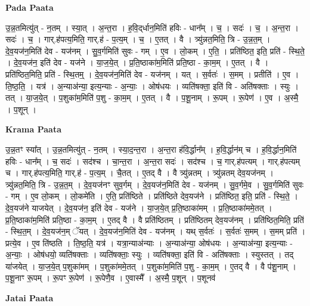 \documentclass[17pt]{extarticle}
\begin{document}
\textbf{Pada Paata} \newline

उ॒न्न॒तमित्यु॑त् - न॒तम् । स्या॒त् । अ॒न्त॒रा । ह॒वि॒द्‌र्धान॒मिति॑ हविः - धान᳚म् । च॒ । सदः॑ । च॒ । अ॒न्त॒रा । सदः॑ । च॒ । गार्.ह॑पत्य॒मिति॒ गार्.ह॑ - प॒त्य॒म् । च॒ । ए॒तत् । वै । त्र्यु॑न्नत॒मिति॒ त्रि - उ॒न्न॒त॒म् । दे॒व॒यज॑न॒मिति॑ देव - यज॑नम् । सु॒व॒र्गमिति॑ सुवः - गम् । ए॒व । लो॒कम् । ए॒ति॒ । प्रति॑ष्ठित॒ इति॒ प्रति॑ - स्थि॒ते॒ । दे॒व॒यज॑न॒ इति॑ देव - यज॑ने । या॒ज॒ये॒त् । प्र॒ति॒ष्ठाका॑म॒मिति॑ प्रति॒ष्ठा - का॒म॒म् । ए॒तत् । वै । प्रति॑ष्ठित॒मिति॒ प्रति॑ - स्थि॒तम्॒ । दे॒व॒यज॑न॒मिति॑ देव - यज॑नम् । यत् । स॒र्वतः॑ । स॒मम् । प्रतीति॑ । ए॒व । ति॒ष्ठ॒ति॒ । यत्र॑ । अ॒न्या‌अ॑न्या॒ इत्य॒न्याः - अ॒न्याः॒ । ओष॑धयः । व्यति॑षक्ता॒ इति॑ वि - अति॑षक्ताः । स्युः । तत् । या॒ज॒ये॒त् । प॒शुका॑म॒मिति॑ प॒शु - का॒म॒म् । ए॒तत् । वै । प॒शू॒नाम् । रू॒पम् । रू॒पेण॑ । ए॒व । अ॒स्मै॒ । प॒शून् ।  \newline


\textbf{Krama Paata} \newline

उ॒न्न॒तꣳ स्या᳚त् । उ॒न्न॒तमित्यु॑त् - न॒तम् । स्या॒द॒न्त॒रा । अ॒न्त॒रा ह॑वि॒र्द्धान᳚म् । ह॒वि॒र्द्धान॑म् च । ह॒वि॒र्द्धान॒मिति॑ हविः - धान᳚म् । च॒ सदः॑ । सद॑श्च । चा॒न्त॒रा । अ॒न्त॒रा सदः॑ । सद॑श्च । च॒ गार्.ह॑पत्यम् । गार्.ह॑पत्यम् च । गार्.ह॑पत्य॒मिति॒ गार्.ह॑ - प॒त्य॒म् । चै॒तत् । ए॒तद् वै । वै त्र्यु॑न्नतम् । त्र्यु॑न्नतम् देव॒यज॑नम् । त्र्यु॑न्नत॒मिति॒ त्रि - उ॒न्न॒त॒म् । दे॒व॒यज॑नꣳ सुव॒र्गम् । दे॒व॒यज॑न॒मिति॑ देव - यज॑नम् । सु॒व॒र्गमे॒व । सु॒व॒र्गमिति॑ सुवः - गम् । ए॒व लो॒कम् । लो॒कमे॑ति । ए॒ति॒ प्रति॑ष्ठिते । प्रति॑ष्ठिते देव॒यज॑ने । प्रति॑ष्ठित॒ इति॒ प्रति॑ - स्थि॒ते॒ । दे॒व॒यज॑ने याजयेत् । दे॒व॒यज॑न॒ इति॑ देव - यज॑ने । या॒ज॒ये॒त् प्र॒ति॒ष्ठाका॑मम् । प्र॒ति॒ष्ठाका॑ममे॒तत् । प्र॒ति॒ष्ठाका॑म॒मिति॑ प्रति॒ष्ठा - का॒म॒म् । ए॒तद् वै । वै प्रति॑ष्ठितम् । प्रति॑ष्ठितम् देव॒यज॑नम् । प्रति॑ष्ठित॒मिति॒ प्रति॑ - स्थि॒त॒म् । दे॒व॒यज॑न॒म् ॅयत् । दे॒व॒यज॑न॒मिति॑ देव - यज॑नम् । यथ् स॒र्वतः॑ । स॒र्वतः॑ स॒मम् । स॒मम् प्रति॑ । प्रत्ये॒व । ए॒व ति॑ष्ठति । ति॒ष्ठ॒ति॒ यत्र॑ । यत्रा॒न्याअ॑न्याः । अ॒न्याअ॑न्या॒ ओष॑धयः । अ॒न्याअ॑न्या॒ इत्य॒न्याः - अ॒न्याः॒ । ओष॑धयो॒ व्यति॑षक्ताः । व्यति॑षक्ताः॒ स्युः । व्यति॑षक्ता॒ इति॑ वि - अति॑षक्ताः । स्युस्तत् । तद् या॑जयेत् । या॒ज॒ये॒त् प॒शुका॑मम् । प॒शुका॑ममे॒तत् । प॒शुका॑म॒मिति॑ प॒शु - का॒म॒म् । ए॒तद् वै । वै प॑शू॒नाम् । प॒शू॒नाꣳ रू॒पम् । रू॒पꣳ रू॒पेण॑ । रू॒पेणै॒व । ए॒वास्मै᳚ । अ॒स्मै॒ प॒शून् । प॒शूनव॑ \newline

\textbf{Jatai Paata} \newline
\end{document}
